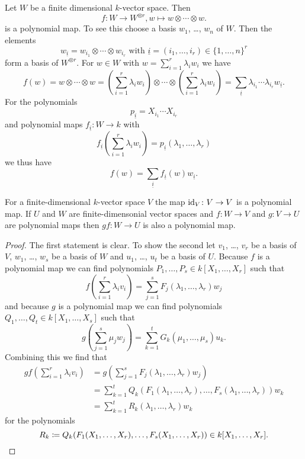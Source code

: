 \begin{expl}
  Let $W$ be a finite dimensional $k$-vector space. Then
  \[
            f
    \colon  W
    \to     W^{\otimes r},
            w
    \mapsto w \otimes \dotsb \otimes w.
  \]
  is a polynomial map.
  To see this choose a basis $w_1$, \dots, $w_n$ of $W$. Then the elements
  \[
      w_{\underline{i}}
    = w_{i_1} \otimes \dotsb \otimes w_{i_r}
    \text{ with }
        \underline{i}
    =   (i_1, \dotsc, i_r)
    \in \{1, \dotsc, n\}^r
  \]
  form a basis of $W^{\otimes r}$.
  For $w \in W$ with $w = \sum_{i=1}^r \lambda_i w_i$ we have
  \[
      f(w)
    = w \otimes \dotsb \otimes w
    =         \left( \sum_{i=1}^r \lambda_i w_i \right)
      \otimes \dotsb
      \otimes \left( \sum_{i=1}^r \lambda_i w_i \right)
    = \sum_{\underline{i}} \lambda_{i_1} \dotsm \lambda_{i_r} w_{\underline{i}}.
  \]
  For the polynomials
  \[
      p_{\underline{i}}
    = X_{i_1} \dotsm X_{i_r}
  \]
  and polynomial maps $f_{\underline{i}} \colon W \to k$ with
  \[
      f_{\underline{i}}\left( \sum_{i=1}^r \lambda_i w_i \right)
    = p_{\underline{i}}(\lambda_1, \dotsc, \lambda_r)
  \]
  we thus have
  \[
      f(w)
    = \sum_{\underline{i}} f_{\underline{i}}(w) w_{\underline{i}}.
  \]
\end{expl}


\begin{lem}
  For a finite-dimensional $k$-vector space $V$ the map $\operatorname{id}_V \colon V \to V$ is a polynomial map.
  If $U$ and $W$ are finite-dimensonial vector spaces and $f \colon W \to V$ and $g \colon V \to U$ are polynomial maps then $gf \colon W \to U$ is also a polynomial map.
\end{lem}
\begin{proof}
  The first statement is clear.
  To show the second let $v_1$, \dots, $v_r$ be a basis of $V$, $w_1$, \dots, $w_s$ be a basis of $W$ and $u_1$, \dots, $u_t$ be a basis of $U$.
  Because $f$ is a polynomial map we can find polynomials $P_1, \dotsc, P_s \in k[X_1, \dotsc, X_r]$ such that
  \[
      f\left( \sum_{i=1}^r \lambda_i v_i \right)
    = \sum_{j=1}^s F_j(\lambda_1, \dotsc, \lambda_r) w_j
  \]
  and because $g$ is a polynomial map we can find polynomials $Q_1, \dotsc, Q_t \in k[X_1, \dotsc, X_s]$ such that
  \[
      g\left( \sum_{j=1}^s \mu_j w_j \right)
    = \sum_{k=1}^t G_k(\mu_1, \dotsc, \mu_s) u_k.
  \]
  Combining this we find that
  \begin{align*}
        gf\left( \sum_{i=1}^r \lambda_i v_i \right)
    &=  g\left( \sum_{j=1}^s F_j(\lambda_1, \dotsc, \lambda_r) w_j \right) \\
    &=  \sum_{k=1}^t Q_k(F_1(\lambda_1, \dotsc, \lambda_r), \dotsc, F_s(\lambda_1, \dotsc, \lambda_r)) w_k \\
    &=  \sum_{k=1}^t R_k(\lambda_1, \dotsc, \lambda_r) w_k
  \end{align*}
  for the polynomials
  \[
              R_k
    \coloneqq Q_k(F_1(X_1, \dotsc, X_r), \dotsc, F_s(X_1, \dotsc, X_r))
    \in       k[X_1, \dotsc, X_r].
    \qedhere
  \]
\end{proof}


